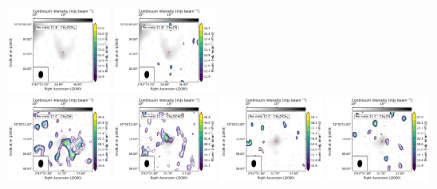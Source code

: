 \begin{figure}[htbp!]
  \includegraphics[width=0.24\textwidth]{./moment0/Set3_ID07_2_CH3OCH3_259311.pdf}
  \includegraphics[width=0.24\textwidth]{./moment0/Set3_ID07_2_CH3CN_257527.pdf}
  \\
  \includegraphics[width=0.24\textwidth]{./moment0/Set3_ID07_3_CH3OH_243915.pdf}
  \includegraphics[width=0.24\textwidth]{./moment0/Set3_ID07_3_CH3OCHO_259342.pdf}
  \includegraphics[width=0.24\textwidth]{./moment0/Set3_ID07_3_CH3OCH3_259311.pdf}
  \includegraphics[width=0.24\textwidth]{./moment0/Set3_ID07_3_CH3CN_257527.pdf}
  \\
  \caption{}
\end{figure}
\addtocounter{figure}{-1}
